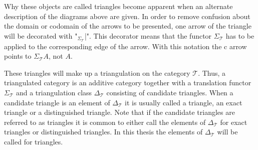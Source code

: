     Why these objects are called triangles become apparent when an alternate description of the diagrams above are given. In order to remove confusion about the domain or codomain of the arrows to be presented, one arrow of the triangle will be decorated with "$_{\Sigma_{\mathcal{T}}}$|". This decorator means that the functor $\Sigma_{\mathcal{T}}$ has to be applied to the corresponding edge of the arrow. With this notation the c arrow points to $\Sigma_{\mathcal{T}}A$, not $A$.

    \begin{center}
    \end{center}

    These triangles will make up a triangulation on the category $\mathcal{T}$. Thus, a triangulated category is an additive category together with a translation functor $\Sigma_{\mathcal{T}}$ and a triangulation class $\Delta_{\mathcal{T}}$ consisting of candidate triangles. When a candidate triangle is an element of $\Delta_{\mathcal{T}}$ it is usually called a triangle, an exact triangle or a distinguished triangle. Note that if the candidate triangles are referred to as triangles it is common to either call the elements of $\Delta_{\mathcal{T}}$ for exact triangles or distinguished triangles. In this thesis the elements of $\Delta_{\mathcal{T}}$ will be called for triangles.

